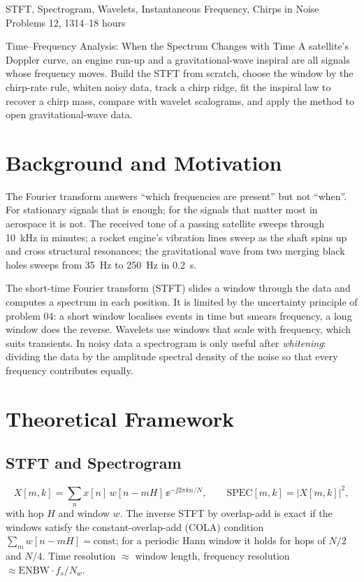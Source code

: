 \documentclass[11pt,a4paper]{article}
\begin{document}
%
{STFT, Spectrogram, Wavelets, Instantaneous Frequency, Chirps in Noise}%
{Problems 12, 13}{14--18 hours}

\begin{summarybox}{Time--Frequency Analysis: When the Spectrum Changes with Time}
A satellite's Doppler curve, an engine run-up and a gravitational-wave inspiral are all signals whose frequency moves. Build the STFT from scratch, choose the window by the chirp-rate rule, whiten noisy data, track a chirp ridge, fit the inspiral law to recover a chirp mass, compare with wavelet scalograms, and apply the method to open gravitational-wave data.
\end{summarybox}


\section*{Background and Motivation}
The Fourier transform answers ``which frequencies are present'' but not ``when''. For stationary signals that is enough; for the signals that matter most in aerospace it is not. The received tone of a passing satellite sweeps through \SI{10}{\kilo\hertz} in minutes; a rocket engine's vibration lines sweep as the shaft spins up and cross structural resonances; the gravitational wave from two merging black holes sweeps from \SI{35}{\hertz} to \SI{250}{\hertz} in \SI{0.2}{\second}.

The short-time Fourier transform (STFT) slides a window through the data and computes a spectrum in each position. It is limited by the uncertainty principle of problem 04: a short window localises events in time but smears frequency, a long window does the reverse. Wavelets use windows that scale with frequency, which suits transients. In noisy data a spectrogram is only useful after \emph{whitening}: dividing the data by the amplitude spectral density of the noise so that every frequency contributes equally.

\section*{Theoretical Framework}
\subsection{STFT and Spectrogram}
\begin{equation}
  X[m,k]=\sum_nx[n]\,w[n-mH]\,\ee^{-\jj2\pi kn/N},\qquad \mathrm{SPEC}[m,k]=|X[m,k]|^2,
  \label{eq:stft}
\end{equation}
with hop $H$ and window $w$. The inverse STFT by overlap-add is exact if the windows satisfy the constant-overlap-add (COLA) condition $\sum_mw[n-mH]=\mathrm{const}$; for a periodic Hann window it holds for hops of $N/2$ and $N/4$. Time resolution $\approx$ window length, frequency resolution $\approx\mathrm{ENBW}\cdot f_s/N_w$.
\end{document}
